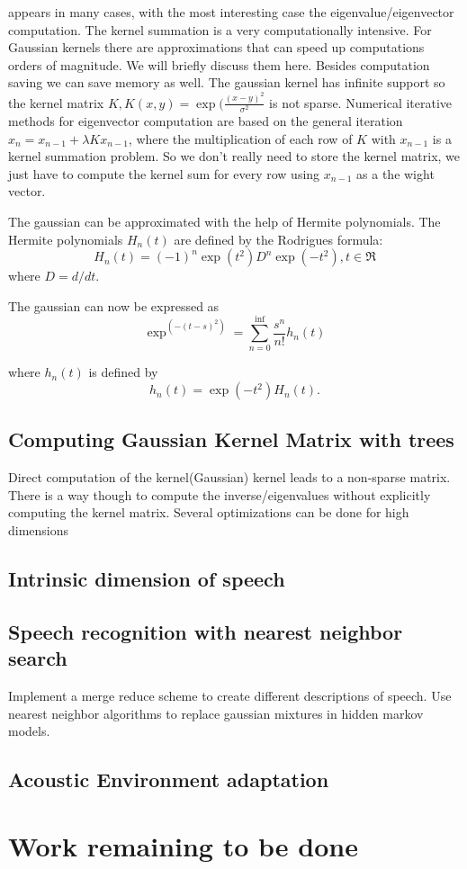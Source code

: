 \documentclass[12pt,letterpaper,doublespaced,ETD,dvips,proposal]{gtthesis}
\begin{document}
\begin{Body}
appears in many cases, with the most interesting case the
eigenvalue/eigenvector computation. The kernel summation is a very
computationally intensive. For Gaussian kernels there are
approximations that can speed up computations orders of magnitude.
We will briefly discuss them here. Besides computation saving we can
save memory as well. The gaussian kernel has infinite support so the
kernel matrix $K, K(x,y)=\exp(\frac{(x-y)^2}{\sigma^2}$ is not
sparse. Numerical iterative methods for eigenvector computation are
based on the general iteration $x_n=x_{n-1}+\lambda Kx_{n-1}$, where
the multiplication of each row of $K$ with $x_{n-1}$ is a kernel
summation problem. So we don't really need to store the kernel
matrix, we just have to compute the kernel sum for every row using
$x_{n-1}$ as a the wight vector.

The gaussian can be approximated with the help of Hermite
polynomials. The Hermite polynomials $H_n(t)$ are defined by the
Rodrigues formula:
\begin{equation}
  H_n(t)=(-1)^n\exp(t^2)D^n\exp(-t^2), t\in \Re
\end{equation}
where $D=d/dt$.

The gaussian can now be expressed as
\begin{equation}
\exp^(-(t-s)^2)=\sum_{n=0}^{\inf}\frac{s^n}{n!}h_n(t)
\end{equation}

where $h_n(t)$ is defined by
\begin{equation}
h_n(t)=\exp(-t^2)H_n(t).
\end{equation}
\subsection{Computing Gaussian Kernel Matrix with trees}
Direct computation of the kernel(Gaussian) kernel leads to a
non-sparse matrix. There is a way though to compute the
inverse/eigenvalues without explicitly computing the kernel matrix.
Several optimizations can be done for high dimensions
\subsection{Intrinsic dimension of speech}

\subsection{Speech recognition with nearest neighbor search}
Implement a merge reduce scheme to create different descriptions of
speech. Use nearest neighbor algorithms to replace gaussian mixtures
in hidden markov models.

\subsection{Acoustic Environment adaptation}

\section{Work remaining to be done}
\label{remains}

\end{Body}
\end{document}
